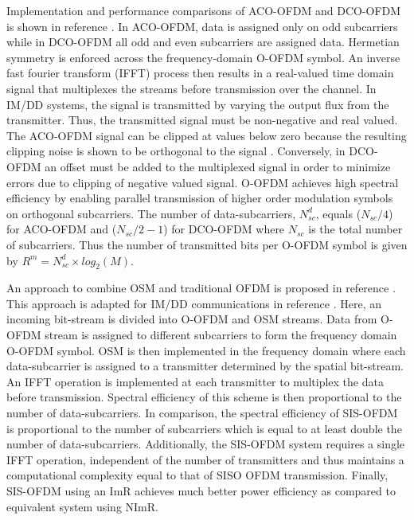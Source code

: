 \documentclass[12pt,letterpaper,onecolumn]{article} %
\begin{document}
Implementation and performance comparisons of ACO-OFDM and DCO-OFDM is shown in reference \cite{mes11a}. In ACO-OFDM, data is assigned only on odd subcarriers while in DCO-OFDM all odd and even subcarriers are assigned data. Hermetian symmetry is enforced across the frequency-domain O-OFDM symbol. An inverse fast fourier transform (IFFT) process then results in a real-valued time domain signal that multiplexes the streams before transmission over the channel. In IM/DD systems, the signal is transmitted by varying the output flux from the transmitter. Thus, the transmitted signal must be non-negative and real valued. The ACO-OFDM signal can be clipped at values below zero because the resulting clipping noise is shown to be orthogonal to the signal \cite{arm06a}. Conversely, in DCO-OFDM an offset must be added to the multiplexed signal in order to minimize errors due to clipping of negative valued signal. O-OFDM achieves high spectral efficiency by enabling parallel transmission of higher order modulation symbols on orthogonal subcarriers. The number of data-subcarriers, $N_{sc}^d$, equals ($N_{sc}/4$) for ACO-OFDM and ($N_{sc}/2-1$) for DCO-OFDM where $N_{sc}$ is the total number of subcarriers. Thus the number of transmitted bits per O-OFDM symbol is given by $R^{m}=N_{sc}^d\times log_2(M)$.

An approach to combine OSM and traditional OFDM is proposed in reference \cite{gan06a}. This approach is adapted for IM/DD communications in reference \cite{zha12a}. Here, an incoming bit-stream is divided into O-OFDM and OSM streams. Data from O-OFDM stream is assigned to different subcarriers to form the frequency domain O-OFDM symbol. OSM is then implemented in the frequency domain where each data-subcarrier is assigned to a transmitter determined by the spatial bit-stream. An IFFT operation is implemented at each transmitter to multiplex the data before transmission. Spectral efficiency of this scheme is then proportional to the number of data-subcarriers. In comparison, the spectral efficiency of SIS-OFDM is proportional to the number of subcarriers which is equal to at least double the number of data-subcarriers. Additionally, the SIS-OFDM system requires a single IFFT operation, independent of the number of transmitters and thus maintains a computational complexity equal to that of SISO OFDM transmission. Finally, SIS-OFDM using an ImR achieves much better power efficiency as compared to equivalent system using NImR.
\end{document}
